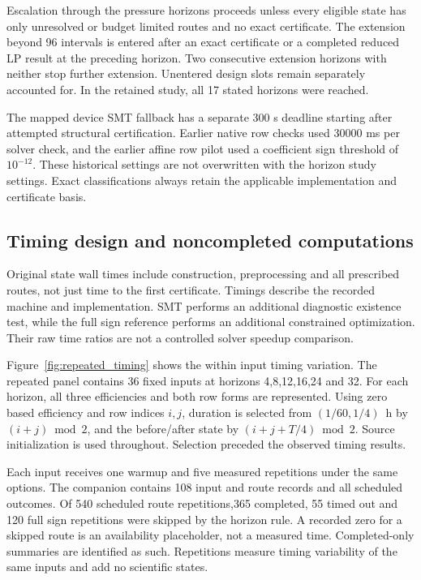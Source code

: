Escalation through the pressure horizons proceeds unless every eligible
state has only unresolved or budget limited routes and no exact certificate.
The extension beyond 96 intervals is entered after an exact certificate or a
completed reduced LP result at the preceding horizon. Two consecutive
extension horizons with neither stop further extension. Unentered design
slots remain separately accounted for. In the retained study, all 17 stated
horizons were reached.

The mapped device SMT fallback has a separate 300 s deadline starting after
attempted structural certification. Earlier native row checks used 30000 ms
per solver check, and the earlier affine row pilot used a coefficient sign
threshold of $10^{-12}$. These historical settings are not overwritten with
the horizon study settings. Exact classifications always retain the
applicable implementation and certificate basis.

\subsection{Timing design and noncompleted computations}
Original state wall times include construction, preprocessing and all
prescribed routes, not just time to the first certificate. Timings describe
the recorded machine and implementation. SMT performs an additional
diagnostic existence test, while the full sign reference performs an
additional constrained optimization. Their raw time ratios are not a
controlled solver speedup comparison.

Figure~\ref{fig:repeated_timing} shows the within input timing variation.
The repeated panel contains 36 fixed inputs at horizons 4,8,12,16,24 and 32.
For each horizon, all three efficiencies and both row forms are represented.
Using zero based efficiency and row indices $i,j$, duration is selected from
$(1/60,1/4)$~h by $(i+j)\bmod2$, and the before/after state by
$(i+j+T/4)\bmod2$. Source initialization is used throughout. Selection
preceded the observed timing results.

Each input receives one warmup and five measured repetitions under the
same options. The companion contains 108 input and route records and all
scheduled outcomes. Of 540 scheduled route repetitions,365 completed,
55 timed out and 120 full sign repetitions were skipped by the horizon rule.
A recorded zero for a skipped route is an availability placeholder, not a
measured time. Completed-only summaries are identified as such. Repetitions
measure timing variability of the same inputs and add no scientific states.



